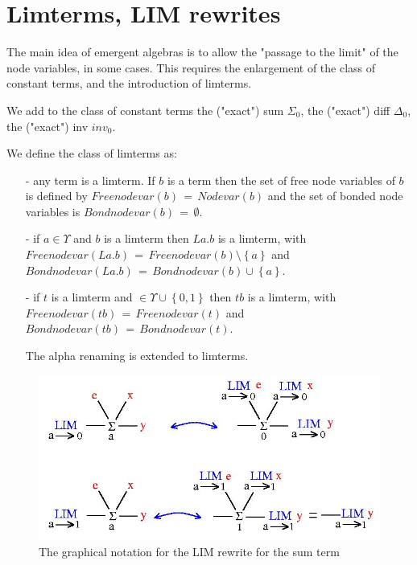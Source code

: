 \section{Limterms, LIM rewrites}
\label{emr}


The main idea of emergent algebras  is to allow the "passage to the limit" of the node variables, in some cases. This requires the enlargement of the class of constant terms, and the introduction of limterms. 

\begin{definition}
We add to the class of constant terms the ("exact") sum $\displaystyle \Sigma_{0}$,  the ("exact") diff $\displaystyle \Delta_{0}$, the ("exact") inv $\displaystyle inv_{0}$. 

We define the class of limterms as: 
\begin{enumerate}
\item[-] any term is a limterm. If $b$ is a term then the set of free node variables of $b$ is defined by $\displaystyle Freenodevar(b) \, = \, Nodevar(b)$ and the set of bonded node variables is  $Bondnodevar(b) \, = \, \emptyset$.
\item[-] if $a \in \Upsilon$ and $b$ is a limterm  then $\displaystyle L a. b$ is a limterm, with $\displaystyle Freenodevar(La.b) \, = \, Freenodevar(b) \setminus \left\{ a \right\}$ and $Bondnodevar(La.b) \, = \, Bondnodevar(b) \cup \left\{ a \right\}$.
\item[-] if $t$ is a limterm and $\displaystyle \in \Upsilon \cup \left\{ 0,1 \right\}$ then $t b$ is a limterm, with $\displaystyle Freenodevar(t b) \, = \, Freenodevar(t)$ and $\displaystyle Bondnodevar(t b) \, = \, Bondnodevar(t)$. 

The alpha renaming is extended to limterms. 
\end{enumerate}
\end{definition}

\begin{figure}[h]\centerline{\includegraphics[width=120mm]{jpg/asum-em-alt.jpg}}  \caption{ The graphical notation for the LIM rewrite for the sum term} \label{asum-em-alt-fig} \end{figure}


